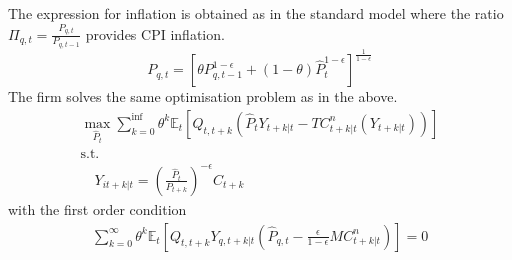 \documentclass[12pt,a4paper,english]{article} %
\newcommand{\E}{\mathbb{E}} %
\begin{document}
	The expression for inflation is obtained as in the standard model where the ratio $\Pi_{q,t} = \frac{P_{q,t}}{P_{q,t-1}}$ provides \ac{CPI} inflation.
	\begin{equation}
		P_{q,t} = 
		\left[ 
		\theta P_{q,t-1}^{1 - \epsilon} + (1 - \theta) \hat{P}_t^{1 - \epsilon}
		\right]^{\frac{1}{1 - \epsilon}}
	\end{equation}
	The firm solves the same optimisation problem as in the above. 
	\begin{equation}
		\begin{aligned}
			\max_{\hat{P}_t}
			\sum_{k=0}^{\inf} \theta^k \E_t 
			\left[
			Q_{t, t+k} 
			\left(
			\hat{P}_t Y_{t+k|t} - TC_{t+k|t}^n(Y_{t+k|t})
			\right)
			\right] \\
			\textrm{s.t.}\\
			\quad
			Y_{it+k|t} = \left(\frac{\hat{P}_t}{P_{t+k}} \right)^{-\epsilon} C_{t+k}
		\end{aligned}
	\end{equation}
	with the first order condition 
	\begin{equation}
		\begin{aligned}
			\sum_{k=0}^{\infty} \theta^k \E_t 
			\left[
			Q_{t,t+k} Y_{q,t+k|t} 
			\left(
			\hat{P}_{q,t} - \frac{\epsilon}{1 - \epsilon} MC_{t+k|t}^n
			\right)
			\right]
			= 0
		\end{aligned}
	\end{equation}
\end{document}
